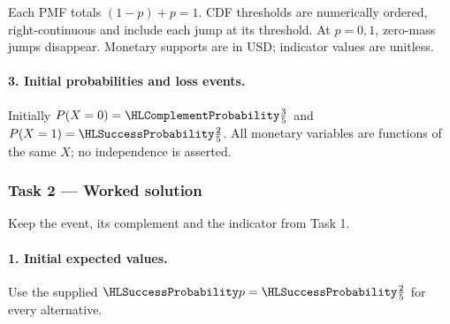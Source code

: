 Each PMF totals $(1-p)+p=1$. CDF thresholds are numerically ordered,
right-continuous and include each jump at its threshold. At $p=0,1$, zero-mass jumps disappear.
Monetary supports are in USD; indicator values are unitless.
\paragraph{3. Initial probabilities and loss events.}
Initially $P(X=0)=\FailureProb{\frac{3}{5}}$ and $P(X=1)=\SuccessProb{\frac{2}{5}}$.
All monetary variables are functions of the same $X$; no independence is asserted.
\clearpage\subsubsection*{Task 2 --- Worked solution}\label{sol:c3-inventory-decision}
Keep the event, its complement and the indicator from Task 1.
\paragraph{1. Initial expected values.}
Use the supplied $\SuccessProb{p}=\SuccessProb{\frac{2}{5}}$ for every alternative.
